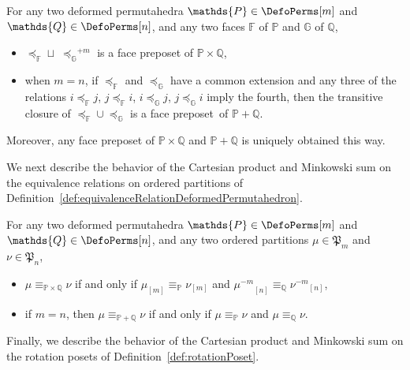 \documentclass[AHL,Unicode,longabstracts,published]{cedram}
\newcommand{\f}[1]{\mathfrak{#1}}
\newcommand{\polytope}[1]{\mathds{#1}}
\begin{document}
\begin{prop}\label{prop:CartesianProductMinkowskiSumFacePreposets}
For any two deformed permutahedra $\polytope{P} \in \DefoPerms[m]$ and \linebreak $\polytope{Q} \in \DefoPerms[n]$, and any two faces $\polytope{F}$ of $\polytope{P}$ and $\polytope{G}$ of $\polytope{Q}$,
\begin{itemize}
\item $\preccurlyeq_\polytope{F} \sqcup \; {\preccurlyeq_\polytope{G}}^{+m}$ is a face preposet of $\polytope{P} \times \polytope{Q}$,
\item when $m = n$, if $\preccurlyeq_\polytope{F}$ and $\preccurlyeq_\polytope{G}$ have a common extension and any three of the relations ${i \preccurlyeq_\polytope{F} j}$, ${j \preccurlyeq_\polytope{F} i}$, ${i \preccurlyeq_\polytope{G} j}$, ${j \preccurlyeq_\polytope{G} i}$ imply the fourth, then the transitive closure of ${\preccurlyeq_\polytope{F} \cup \preccurlyeq_\polytope{G}}$ is a face preposet~of $\polytope{P} + \polytope{Q}$.
\end{itemize}
Moreover, any face preposet of $\polytope{P} \times \polytope{Q}$ and $\polytope{P} + \polytope{Q}$ is uniquely obtained this way.
\end{prop}

We next describe the behavior of the Cartesian product and Minkowski sum on the equivalence relations on ordered partitions of Definition~\ref{def:equivalenceRelationDeformedPermutahedron}.

\begin{prop}\label{prop:CartesianProductMinkowskiSumEquivalenceRelations}
For any two deformed permutahedra $\polytope{P} \in \DefoPerms[m]$ and \linebreak $\polytope{Q} \in \DefoPerms[n]$, and any two ordered partitions $\mu \in \f{P}_m$ and $\nu \in \f{P}_n$,
\begin{itemize}
\item $\mu \equiv_{\polytope{P} \times \polytope{Q}} \nu$ if and only if $\mu_{[m]} \equiv_{\polytope{P}} \nu_{[m]}$ and ${\mu^{-m}}_{[n]} \equiv_{\polytope{Q}} {\nu^{-m}}_{[n]}$,
\item if $m = n$, then ${\mu \equiv_{\polytope{P} + \polytope{Q}} \nu}$ if and only if $\mu \equiv_{\polytope{P}} \nu$ and $\mu \equiv_{\polytope{Q}} \nu$.
\end{itemize}
\end{prop}

Finally, we describe the behavior of the Cartesian product and Minkowski sum on the rotation posets of Definition~\ref{def:rotationPoset}.
\end{document}
